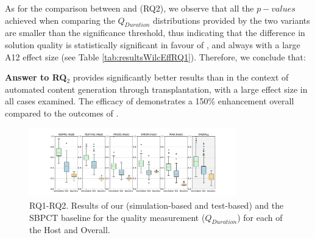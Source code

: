 As for the comparison between \simhotep{} and \timhotep{} (RQ2),  we observe that all the $p-values$ achieved when comparing the $Q_{Duration}$ distributions provided by the two \ApproachName{} variants are smaller than the significance threshold, thus indicating that the difference in solution quality is statistically significant in favour of \simhotep{}, and always with a large A12 effect size (see Table \ref{tab:resultsWilcEffRQ1}). Therefore, we conclude that:

\noindent  \textbf{Answer to RQ$_2$} \simhotep{} provides significantly better results than \timhotep{} in the context of automated content generation through transplantation, with a large effect size in all cases examined. The efficacy of \simhotep{} demonstrates a 150\% enhancement overall compared to the outcomes of \timhotep{}.

\begin{figure}[tb]
    \centering
    \includegraphics[width=0.8\textwidth]{Figures/Imhotep_with_legend_and_oracle_average-v4.pdf}
    \caption{RQ1-RQ2. Results of our \ApproachName{} (simulation-based and test-based) and the SBPCT baseline for the quality measurement ($Q_{Duration}$) for each of the \CaseStudy{} Host and Overall.}
    \label{fig:results}
\end{figure}